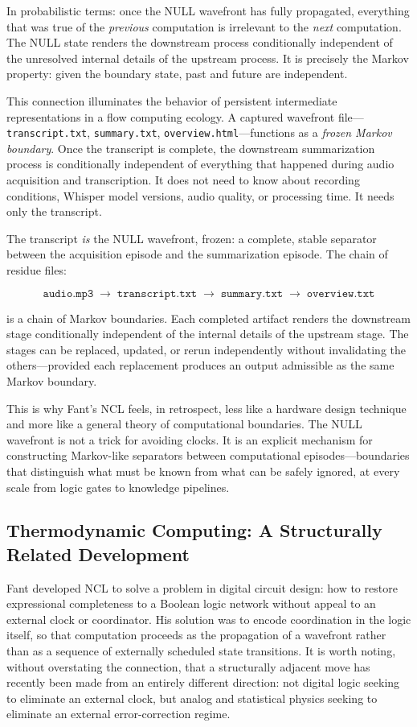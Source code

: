 \documentclass[12pt, a4paper]{article}
\begin{document}
In probabilistic terms: once the NULL wavefront has fully
propagated, everything that was true of the \emph{previous}
computation is irrelevant to the \emph{next} computation. The
NULL state renders the downstream process conditionally
independent of the unresolved internal details of the upstream
process. It is precisely the Markov property: given the
boundary state, past and future are independent.

This connection illuminates the behavior of persistent
intermediate representations in a flow computing ecology.
A captured wavefront file---\texttt{transcript.txt},
\texttt{summary.txt}, \texttt{overview.html}---functions as
a \emph{frozen Markov boundary}. Once the transcript is
complete, the downstream summarization process is
conditionally independent of everything that happened during
audio acquisition and transcription. It does not need to know
about recording conditions, Whisper model versions, audio
quality, or processing time. It needs only the transcript.

The transcript \emph{is} the NULL wavefront, frozen: a
complete, stable separator between the acquisition episode
and the summarization episode. The chain of residue files:

\[
\texttt{audio.mp3} \;\to\; \texttt{transcript.txt} \;\to\;
\texttt{summary.txt} \;\to\; \texttt{overview.txt}
\]

is a chain of Markov boundaries. Each completed artifact
renders the downstream stage conditionally independent of the
internal details of the upstream stage. The stages can be
replaced, updated, or rerun independently without invalidating
the others---provided each replacement produces an output
admissible as the same Markov boundary.

This is why Fant's NCL feels, in retrospect, less like a
hardware design technique and more like a general theory of
computational boundaries. The NULL wavefront is not a trick
for avoiding clocks. It is an explicit mechanism for
constructing Markov-like separators between computational
episodes---boundaries that distinguish what must be known
from what can be safely ignored, at every scale from logic
gates to knowledge pipelines.

\subsection{Thermodynamic Computing: A Structurally Related
Development}

Fant developed NCL to solve a problem in digital circuit design:
how to restore expressional completeness to a Boolean logic
network without appeal to an external clock or coordinator. His
solution was to encode coordination in the logic itself, so that
computation proceeds as the propagation of a wavefront rather
than as a sequence of externally scheduled state transitions.
It is worth noting, without overstating the connection, that a
structurally adjacent move has recently been made from an
entirely different direction: not digital logic seeking to
eliminate an external clock, but analog and statistical physics
seeking to eliminate an external error-correction regime.
\end{document}
